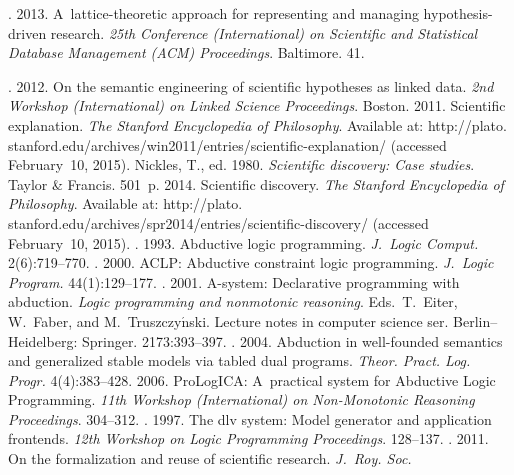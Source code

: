 \begin{multicols}{2}
{{\begin{thebibliography}{99}
. 2013. A~lattice-theoretic approach
for representing and managing hypothesis-driven research. \textit{25th Conference
(International) on Scientific and Statistical Database Management (ACM)
Proceedings}. Baltimore. 41.


. 2012. On the
semantic engineering of scientific hypotheses as linked data. \textit{2nd Workshop
(International) on Linked Science Proceedings}. Boston.
 2011. Scientific explanation. \textit{The Stanford Encyclopedia
of Philosophy}. Available at:  {\sf
http://plato. stanford.edu/archives/win2011/entries/scientific-explanation/} (accessed
February~10, 2015).
Nickles, T., ed. 1980. \textit{Scientific discovery: Case studies}. Taylor \& Francis.
501~p.
 2014. Scientific discovery. \textit{The Stanford
Encyclopedia of Philosophy}. Available at: {\sf
http://plato. stanford.edu/archives/spr2014/entries/scientific-discovery/}
(accessed February~10, 2015).
. 1993. Abductive logic
programming. \textit{J.~Logic Comput.} 2(6):719--770.
. 2000. ACLP: Abductive constraint
logic programming. \textit{J.~Logic Program.} 44(1):129--177.
. 2001. A-system: Declarative programming
with abduction. \textit{Logic programming and nonmotonic reasoning}.
Eds.\ T.~Eiter, W.~Faber, and M.~Truszczy$\acute{\mbox{n}}$ski.
Lecture notes in computer science ser. Berlin--Heidelberg:
Springer. 2173:393--397.
. 2004. Abduction in well-founded
semantics and generalized stable models via tabled dual programs. \textit{Theor.
Pract. Log. Progr.} 4(4):383--428.
 2006. ProLogICA: A~practical system for Abductive
Logic Programming. \textit{11th Workshop (International) on Non-Monotonic
Reasoning Proceedings}. 304--312.
. 1997. The dlv system: Model generator and application frontends.
\textit{12th Workshop on Logic Programming Proceedings}.
128--137.
. 2011.
On the formalization and reuse of scientific research. \textit{J.~Roy. Soc.
}
\end{thebibliography}}}
\end{multicols}
